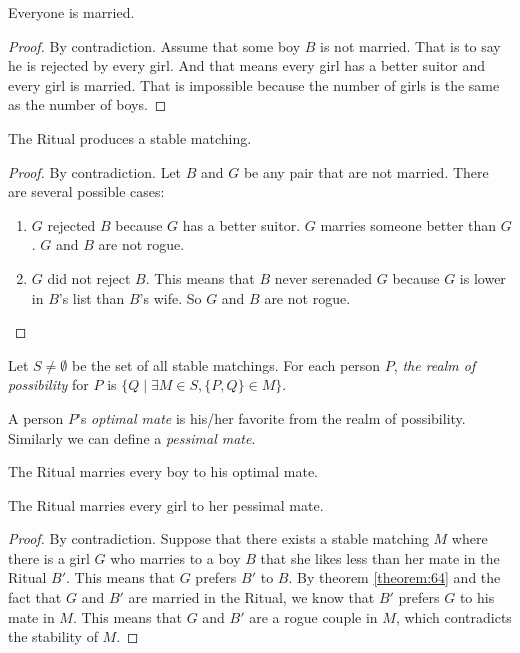 \documentclass[11pt]{article}
\begin{document}
\begin{theorem}
Everyone is married.
\end{theorem}

\begin{proof}
By contradiction. Assume that some boy $B$ is not married. That is to say he is rejected by every
girl. And that means every girl has a better suitor and every girl is married. That is impossible
because the number of girls is the same as the number of boys.
\end{proof}

\begin{theorem}
The Ritual produces a stable matching.
\end{theorem}

\begin{proof}
By contradiction. Let $B$ and $G$ be any pair that are not married. There are several possible cases:
\begin{enumerate}
\item $G$ rejected $B$ because $G$ has a better suitor. $G$ marries someone better than $G$. $G$ and
$B$ are not rogue.
\item $G$ did not reject $B$. This means that $B$ never serenaded $G$ because $G$ is lower in $B$'s
list than $B$'s wife. So $G$ and $B$ are not rogue.
\end{enumerate}
\end{proof}

\begin{definition}
Let $S \neq \emptyset$ be the set of all stable matchings. For each person $P$, \emph{the realm of
possibility} for $P$ is $\{Q \mid \exists M \in S,\{P,Q\} \in M\}$.
\end{definition}

\begin{definition}
A person $P$'s \emph{optimal mate} is his/her favorite from the realm of possibility. Similarly we
can define a \emph{pessimal mate}.
\end{definition}

\begin{theorem} \label{theorem:64}
The Ritual marries every boy to his optimal mate.
\end{theorem}

\begin{theorem}
The Ritual marries every girl to her pessimal mate.
\end{theorem}

\begin{proof}
By contradiction. Suppose that there exists a stable matching $M$ where there is a girl $G$ who
marries to a boy $B$ that she likes less than her mate in the Ritual $B'$. This means that $G$
prefers $B'$ to $B$. By theorem \ref{theorem:64} and the fact that $G$ and $B'$ are married in the
Ritual, we know that $B'$ prefers $G$ to his mate in $M$. This means that $G$ and $B'$ are a rogue
couple in $M$, which contradicts the stability of $M$.
\end{proof}
\end{document}
